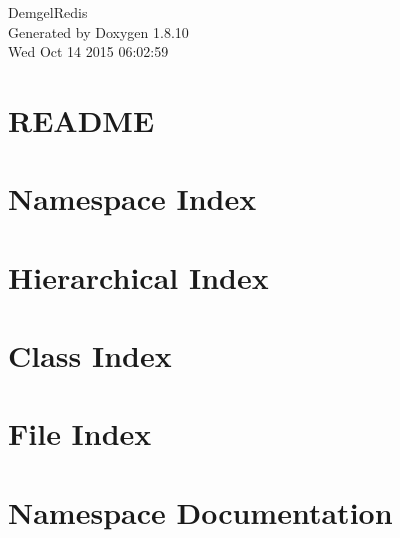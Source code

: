 \documentclass[twoside]{book}
\newcommand{\+}{\discretionary{\mbox{\scriptsize$\hookleftarrow$}}{}{}}
\newcommand{\clearemptydoublepage}{%
  \newpage{\pagestyle{empty}\cleardoublepage}%
}
\begin{document}
\hypersetup{pageanchor=false,
             bookmarks=true,
             bookmarksnumbered=true,
             pdfencoding=unicode
            }
\begin{titlepage}
\vspace*{7cm}
\begin{center}%
{\Large Demgel\+Redis }\\
\vspace*{1cm}
{\large Generated by Doxygen 1.8.10}\\
\vspace*{0.5cm}
{\small Wed Oct 14 2015 06:02:59}\\
\end{center}
\end{titlepage}
\clearemptydoublepage
\tableofcontents
\clearemptydoublepage
{}
\hypersetup{pageanchor=true}

\chapter{R\+E\+A\+D\+M\+E}
\label{md__g_1__libraries__demgel_8_redis__r_e_a_d_m_e}
\hypertarget{md__g_1__libraries__demgel_8_redis__r_e_a_d_m_e}{}

\chapter{Namespace Index}

\chapter{Hierarchical Index}

\chapter{Class Index}

\chapter{File Index}

\chapter{Namespace Documentation}













\end{document}
